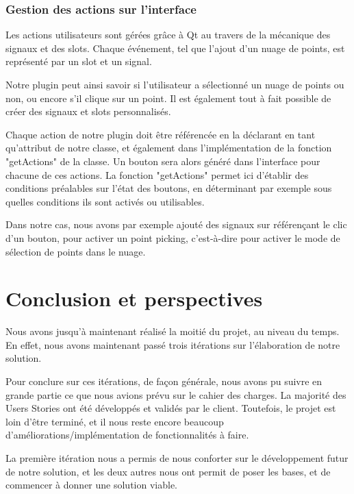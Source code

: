 \documentclass[12pt,titlepage,french]{article}
\begin{document}
\subsubsection{Gestion des actions sur l'interface}

Les actions utilisateurs sont gérées grâce à Qt au travers de la mécanique des signaux et des slots. Chaque événement, tel que l'ajout d'un nuage de points, est représenté par un slot et un signal. \newline

Notre plugin peut ainsi savoir si l'utilisateur a sélectionné un nuage de points ou non, ou encore s'il clique sur un point. Il est également tout à fait possible de créer des signaux et slots personnalisés. \newline

Chaque action de notre plugin doit être référencée en la déclarant en tant qu'attribut de notre classe, et également dans l'implémentation de la fonction "getActions" de la classe. Un bouton sera alors généré dans l'interface pour chacune de ces actions. La fonction "getActions" permet ici d'établir des conditions préalables sur l'état des boutons, en déterminant par exemple sous quelles conditions ils sont activés ou utilisables. \newline

Dans notre cas, nous avons par exemple ajouté des signaux sur référençant le clic d'un bouton, pour activer un point picking, c'est-à-dire pour activer le mode de sélection de points dans le nuage.

\section{Conclusion et perspectives}

Nous avons jusqu'à maintenant réalisé la moitié du projet, au niveau du temps. En effet, nous avons maintenant passé trois itérations sur l'élaboration de notre solution. \newline

Pour conclure sur ces itérations, de façon générale, nous avons pu suivre en grande partie ce que nous avions prévu sur le cahier des charges. La majorité des Users Stories ont été développés et validés par le client. Toutefois, le projet est loin d'être terminé, et il nous reste encore beaucoup d'améliorations/implémentation de fonctionnalités à faire.

La première itération nous a permis de nous conforter sur le développement futur de notre solution, et les deux autres nous ont permit de poser les bases, et de commencer à donner une solution viable.
\end{document}
